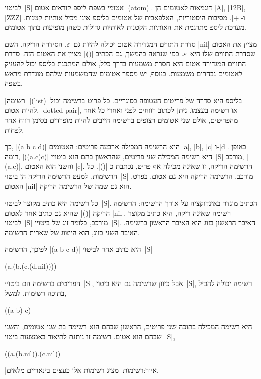 לביטוי~\E|S| אטומי בשפת ליספ קוראים אטום \E|(atom)|. דוגמאות לאטומים הן \E|A|,
\E|12B|, \E|ZZZ| ו-\E|+|. מסיבות היסטוריות, האלפאבית של אטומים בליספ אינו מכיל
אותיות קטנות. מערכת ליספ מתרגמת את האותיות הקטנות לאותיות גדולות כשהן מופיעות
בתוך אטומים.

סדרת התווים המגדירה אטום יכולה להיות גם~$ε$, הסידרה הריקה. השם \E|nil| מציין את
האטום שסדרת התווים שלו היא~$ε$. כפי שנראה בהמשך, גם הכתיב \E|()| מציין את האטום
הזה. סדרת התווים המגדירה אטום היא חסרת משמעות בדרך כלל, אולם המתכנת בליספ יכול
להעניק לאטומים נבחרים משמעות. בנוסף, יש מספר אטומים שהמשמעות שלהם מוגדרת מראש
בשפה.

\ע|רשימה| \E|(list)| בליספ היא סדרה של פריטים העטופה בסוגריים. כל פריט ברשימה
יכול להיות אטום, \E|dotted-pair|, או רשימה בעצמו. ניתן לכתוב רווחים לפני ואחרי
כל אחד מהפריטים, אולם שני אטומים רצופים ברשימה חייבים להיות מופרדים בסימן רווח
אחד לפחות.

כך, \E|(a b c d)| היא הרשימה המכילה ארבעה פריטים: האטומים \E|a|, \E|b|, \E|c|
ו-\E|d|. באופן דומה, \E|((a.c)c)| היא רשימה המכילה שני פריטים, שהראשון בהם הוא
ביטויי~\E|S| מורכב, \E|(a.c)|, והשני הוא האטום \E|c|. הרשימה הריקה, זו שאינה
מכילה אף פריט, נכתבת כ-\E|()|. כל הרשימות, למעט הרשימה הריקה הן ביטוי~\E|S|
מורכב. הרשימה הריקה היא גם אטום, בפרט, האטום \E|nil| הוא גם שמה של הרשימה הריקה.

כל רשימה היא כתיב מקוצר לביטוי~\E|S|. הכתיב מוגדר באינדוקציה על אורך הרשימה:
הרשימה הריקה \E|()| שהיא גם כתיב אחר לאטום \E|nil|. רשימה שאינה ריקה, היא כתיב
מקוצר לביטוי~\E|S| מורכב, כלומר זוג של ביטויי~\E|S|. האיבר הראשון בזוג הוא
האיבר הראשון ברשימה. האיבר השני בזוג, הוא הייצוג של שארית הרשימה.

לפיכך, הרשימה \E|(a b c d)| היא כתיב אחר לביטוי~\E|S|
\begin{LISP}
(a.(b.(c.(d.nil))))
\end{LISP}

הפריטים ברשימה הם ביטויי~\E|S|, אבל כיוון שרשימה גם היא ביטוי~\E|S|, רשימה
יכולה להכיל בתוכה רשימות. למשל,
\begin{LISP}
  ((a b) c)
\end{LISP}
היא רשימה המכילה בתוכה שני פריטים, הראשון שבהם הוא רשימה בת שני אטומים, והשני
שבהם הוא אטום. רשימה זו ניתנת לתיאור באמצעות ביטוי~\E|S|,
\begin{LISP}
  ((a.(b.nil)).(c.nil))
\end{LISP}
|איור:רשימות| מציג רשימות אלו כעצים בינאריים מלאים.


